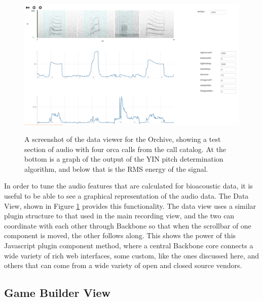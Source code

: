 \begin{figure}[t]
\centering
\includegraphics[width=\columnwidth]{figures/orchiveV2dataView}
\label{fig:orchiveV2dataView}
\caption{A screenshot of the data viewer for the Orchive, showing a
  test section of audio with four orca calls from the call catalog.
  At the bottom is a graph of the output of the YIN pitch
  determination algorithm, and below that is the RMS energy of the
  signal.}
\end{figure}

In order to tune the audio features that are calculated for
bioacoustic data, it is useful to be able to see a graphical
representation of the audio data.  The Data View, shown in Figure
\ref{fig:orchiveV2dataView} provides this functionality.  The data
view uses a similar plugin structure to that used in the main
recording view, and the two can coordinate with each other through
Backbone so that when the scrollbar of one component is moved, the
other follows along.  This shows the power of this Javascript plugin
component method, where a central Backbone core connects a wide
variety of rich web interfaces, some custom, like the ones discussed
here, and others that can come from a wide variety of open and closed
source vendors.


\subsection{Game Builder View}

